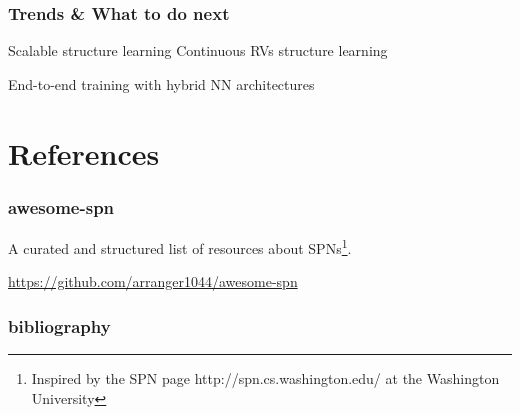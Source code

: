 \documentclass[10pt, t, xcolor={usenames,dvipsnames,svgnames}, compress]{beamer}
\begin{document}
\begin{frame}
  \frametitle{Trends \& What to do next}
  Scalable structure learning
  Continuous RVs structure learning

  End-to-end training with hybrid NN architectures
\end{frame}

\section{References}
{
  \begin{frame}[c]
    \sectionpage
  \end{frame}
}

\begin{frame}
  \frametitle{awesome-spn}
  A curated and structured list of resources about SPNs\footnote{Inspired by the
    SPN page {http://spn.cs.washington.edu/} at the Washington  University}.

  \url{https://github.com/arranger1044/awesome-spn}
\end{frame}

\begin{frame} [allowframebreaks]
  \frametitle{bibliography}
  \setlength\bibitemsep{2pt}
  \printbibliography
\end{frame}
\end{document}
